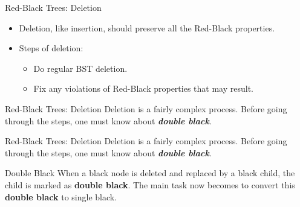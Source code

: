 \documentclass{beamer}
\begin{document}
\begin{frame}{Red-Black Trees: Deletion}
    \begin{itemize}
        \item  Deletion, like insertion, should preserve all the Red-Black properties.        
        \item \vspace{0.2cm} Steps of deletion:
        \vspace{0.1cm}
        \begin{itemize}
            \item[$\blacksquare$]  Do regular BST deletion.
            \item[$\blacksquare$]  Fix any violations of Red-Black properties that may result.
        \end{itemize}
    \end{itemize}
\end{frame}

\begin{frame}{Red-Black Trees: Deletion}
        Deletion is a fairly complex process. Before going through the steps, one must know about \textbf{\textit{double black}}. \\
\end{frame}

\begin{frame}{Red-Black Trees: Deletion}
        Deletion is a fairly complex process. Before going through the steps, one must know about \textbf{\textit{double black}}. \\

        \vspace{0.5cm}
        \begin{block}{Double Black}
        When a black node is deleted and replaced by a black child, the child is marked as \textbf{double black}. The main task now becomes to convert this \textbf{double black} to single black.
        \end{block}
\end{frame}
\end{document}
